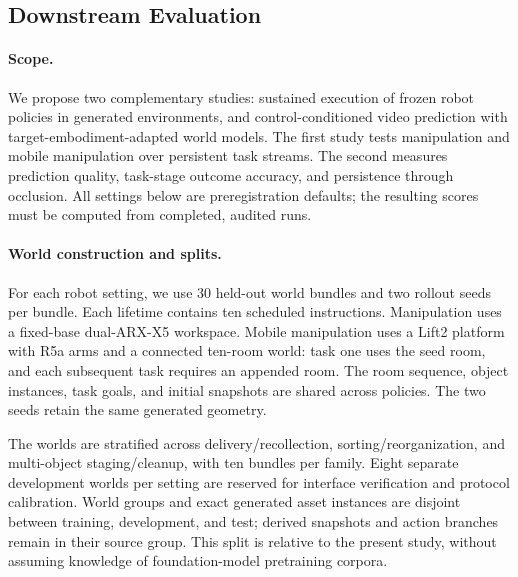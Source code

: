 
\subsection{Downstream Evaluation}
\label{sec:downstream_setting}

\paragraph{Scope.}
We propose two complementary studies: sustained execution of frozen robot
policies in generated environments, and control-conditioned video prediction
with target-embodiment-adapted world models. The first study tests manipulation
and mobile manipulation over persistent task streams. The second measures
prediction quality, task-stage outcome accuracy, and persistence through
occlusion. All settings below are preregistration defaults; the resulting
scores must be computed from completed, audited runs.

\paragraph{World construction and splits.}
For each robot setting, we use 30 held-out world bundles and two rollout seeds
per bundle. Each lifetime contains ten scheduled instructions. Manipulation
uses a fixed-base dual-ARX-X5 workspace. Mobile manipulation uses a Lift2
platform with R5a arms and a connected ten-room world: task one uses the seed
room, and each subsequent task requires an appended room. The room sequence,
object instances, task goals, and initial snapshots are shared across policies.
The two seeds retain the same generated geometry.

The worlds are stratified across delivery/recollection,
sorting/reorganization, and multi-object staging/cleanup, with ten bundles
per family. Eight separate development worlds per setting are reserved for
interface verification and protocol calibration. World groups and exact
generated asset instances are disjoint between training, development, and
test; derived snapshots and action branches remain in their source group.
This split is relative to the present study, without assuming knowledge of
foundation-model pretraining corpora.

